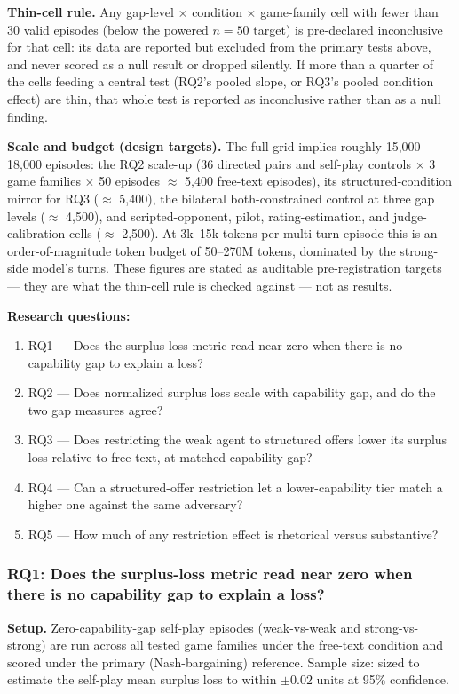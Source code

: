 \documentclass[11pt]{article}
\begin{document}
\textbf{Thin-cell rule.} Any gap-level $\times$ condition $\times$ game-family cell with fewer than 30 valid episodes (below the powered $n=50$ target) is pre-declared inconclusive for that cell: its data are reported but excluded from the primary tests above, and never scored as a null result or dropped silently. If more than a quarter of the cells feeding a central test (RQ2's pooled slope, or RQ3's pooled condition effect) are thin, that whole test is reported as inconclusive rather than as a null finding.

\textbf{Scale and budget (design targets).} The full grid implies roughly 15{,}000--18{,}000 episodes: the RQ2 scale-up (36 directed pairs and self-play controls $\times$ 3 game families $\times$ 50 episodes $\approx$ 5{,}400 free-text episodes), its structured-condition mirror for RQ3 ($\approx$ 5{,}400), the bilateral both-constrained control at three gap levels ($\approx$ 4{,}500), and scripted-opponent, pilot, rating-estimation, and judge-calibration cells ($\approx$ 2{,}500). At 3k--15k tokens per multi-turn episode this is an order-of-magnitude token budget of 50--270M tokens, dominated by the strong-side model's turns. These figures are stated as auditable pre-registration targets --- they are what the thin-cell rule is checked against --- not as results.

\textbf{Research questions:}
\begin{enumerate}[leftmargin=1.6em]
\item RQ1 --- Does the surplus-loss metric read near zero when there is no capability gap to explain a loss?
\item RQ2 --- Does normalized surplus loss scale with capability gap, and do the two gap measures agree?
\item RQ3 --- Does restricting the weak agent to structured offers lower its surplus loss relative to free text, at matched capability gap?
\item RQ4 --- Can a structured-offer restriction let a lower-capability tier match a higher one against the same adversary?
\item RQ5 --- How much of any restriction effect is rhetorical versus substantive?
\end{enumerate}

\subsubsection{RQ1: Does the surplus-loss metric read near zero when there is no capability gap to explain a loss?}
\textbf{Setup.} Zero-capability-gap self-play episodes (weak-vs-weak and strong-vs-strong) are run across all tested game families under the free-text condition and scored under the primary (Nash-bargaining) reference. Sample size: sized to estimate the self-play mean surplus loss to within $\pm 0.02$ units at 95\% confidence.
\end{document}
